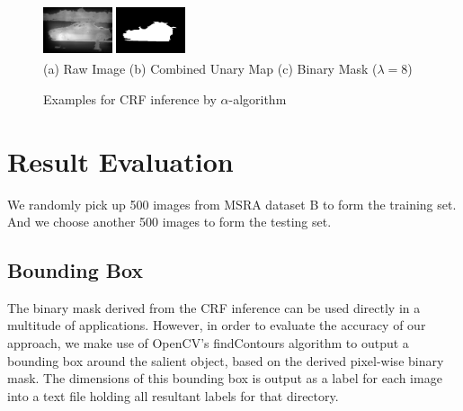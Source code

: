 \documentclass[10pt,twocolumn,letterpaper]{article}
\begin{document}
\begin{figure}[h]
\begin{center}
    \includegraphics[width=0.8in,height=0.6in]{./Figures/CRFinference/5_162_162349_3.jpg}
    \includegraphics[width=0.8in,height=0.6in]{./Figures/CRFinference/5_162_162349_2.jpg} \\
    \footnotesize  (a) Raw Image (b) Combined Unary Map  (c) Binary Mask ($\lambda=8$)\\
     \caption{Examples for CRF inference by $\alpha$-algorithm}
\end{center}
\end{figure}

\section{Result Evaluation}
We randomly pick up 500 images from MSRA dataset B to form the training set. And we choose another 500 images to form the testing set.

\subsection{Bounding Box}
The binary mask derived from the CRF inference can be used directly in a multitude of applications. However, in order to evaluate the accuracy of our approach, we make use of OpenCV's findContours algorithm to output a bounding box around the salient object, based on the derived pixel-wise binary mask. The dimensions of this bounding box is output as a label for each image into a text file holding all resultant labels for that directory.

\end{document}
